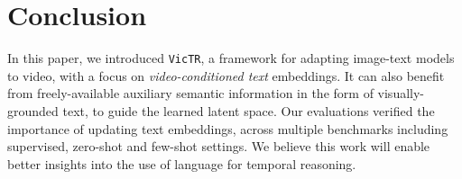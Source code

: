 \documentclass[10pt,twocolumn,letterpaper]{article}
\newcommand{\ours}{\texttt{VicTR}}
\begin{document}
\section{Conclusion}
\label{sec:conclusion}

In this paper, we introduced \ours, a framework for adapting image-text models to video, with a focus on \textit{video-conditioned text} embeddings. It can also benefit from freely-available auxiliary semantic information in the form of visually-grounded text, to guide the learned latent space. Our evaluations verified the importance of updating text embeddings, across multiple benchmarks including supervised, zero-shot and few-shot settings. We believe this work will enable better insights into the use of language for temporal reasoning.


{\small
\balance


}
\end{document}
